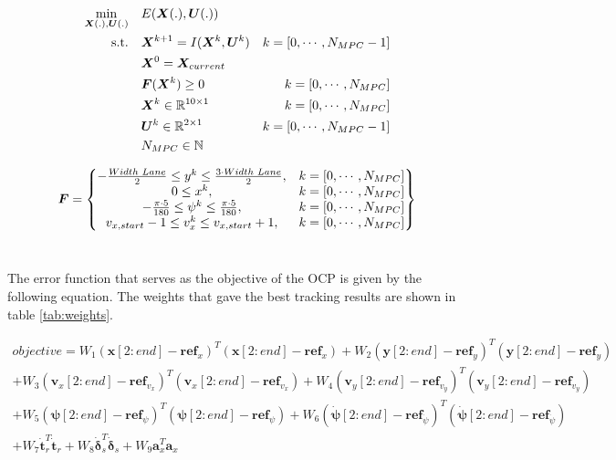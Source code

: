 \begin{equation}\label{opt:tracking}
\begin{aligned}
\min_{\bm{X}(.),\bm{U}(.)} \quad &  E(\bm{X}(.),\bm{U}(.)) \\
\textrm{s.t.} \quad & \bm{X}^{k+1} = I(\bm{X}^{k}, \bm{U}^{k}) & k = [0,\cdots, N_{MPC}-1]\\
& \bm{X}^{0} = \bm{X}_{current} \\
& \bm{F}(\bm{X}^{k}) \geq 0	& k = [0,\cdots, N_{MPC}]\\
& \bm{X}^{k}\in \mathbb{R}^{10\times 1}  & k = [0,\cdots, N_{MPC}]\\
& \bm{U}^{k}\in \mathbb{R}^{2\times 1} \hspace{3 mm} & k = [0,\cdots, N_{MPC}-1]\\
&  N_{MPC} \in \mathbb{N}
\end{aligned}
\end{equation}

\begin{equation}\label{eq:F_MPC}
\bm{F} =
\begin{Bmatrix}
-\frac{Width\hspace{1mm}Lane}{2} \leq y^k \leq \frac{3\cdot Width\hspace{1mm}Lane}{2}, & k = [0,\cdots, N_{MPC}] \\
0 \leq x^k, & k = [0,\cdots, N_{MPC}] \\
-\frac{\pi\cdot 5}{180} \leq \psi^k \leq \frac{\pi\cdot 5}{180}, & k = [0,\cdots, N_{MPC}] \\
v_{x,start}-1 \leq v_x^k \leq v_{x,start}+1, & k = [0,\cdots, N_{MPC}]
\end{Bmatrix}
\end{equation}\

The error function that serves as the objective of the OCP is given by the following equation. The weights that gave the best tracking results are shown in table \ref{tab:weights}.

\begin{multline*} 
objective=W_1(\bm{x}[2:end]-\bm{ref}_x)^T(\bm{x}[2:end]-\bm{ref}_x)+W_2(\bm{y}[2:end]-\bm{ref}_y)^T(\bm{y}[2:end]-\bm{ref}_y)\\
+W_3(\bm{v}_x[2:end]-\bm{ref}_{v_x})^T(\bm{v}_x[2:end]-\bm{ref}_{v_x})+W_4(\bm{v}_y[2:end]-\bm{ref}_{v_y})^T(\bm{v}_y[2:end]-\bm{ref}_{v_y})\\+W_5(\bm{\psi}[2:end]-\bm{ref}_{\psi})^T(\bm{\psi}[2:end]-\bm{ref}_\psi)
+W_6(\bm{\dot{\psi}}[2:end]-\bm{ref}_{\dot{\psi}})^T(\bm{\dot{\psi}}[2:end]-\bm{ref}_{\dot{\psi}})\\ + W_7\dot{\bm{t}}_r^T\dot{\bm{t}}_r+W_8\dot{\bm{\delta}}_s^T\dot{\bm{\delta}}_s + W_9\bm{a}_x^T\bm{a}_x
\end{multline*}

